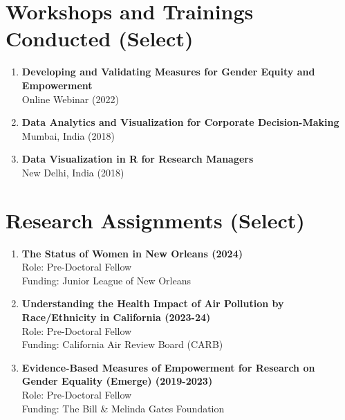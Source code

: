 \documentclass[11pt,letterpaper]{article}
\begin{document}
\section*{Workshops and Trainings Conducted (Select)}
\label{sec:orgf173e08}

\begin{enumerate}
\item \textbf{Developing and Validating Measures for Gender Equity and Empowerment} \\
Online Webinar (2022) 

\item \textbf{Data Analytics and Visualization for Corporate Decision-Making} \\
Mumbai, India (2018) 

\item \textbf{Data Visualization in R for Research Managers} \\
New Delhi, India (2018) 
\end{enumerate}
\section*{Research Assignments (Select)}
\label{sec:orgc7ce3ea}

\begin{enumerate}
\item \textbf{The Status of Women in New Orleans (2024)} \\
Role: Pre-Doctoral Fellow \\
Funding: Junior League of New Orleans 

\item \textbf{Understanding the Health Impact of Air Pollution by Race/Ethnicity in California (2023-24)}\\
Role: Pre-Doctoral Fellow \\
Funding: California Air Review Board (CARB) 

\item \textbf{Evidence-Based Measures of Empowerment for Research on Gender Equality (Emerge) (2019-2023)}\\
Role: Pre-Doctoral Fellow \\
Funding: The Bill \& Melinda Gates Foundation 
\end{enumerate}
\end{document}
